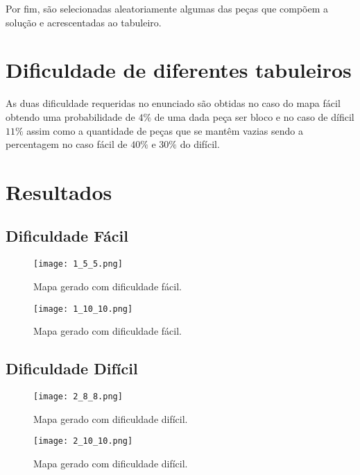 \documentclass[a4paper]{report} %
\begin{document}
Por fim, são selecionadas aleatoriamente algumas das peças que compõem a solução e acrescentadas ao tabuleiro.

\section{Dificuldade de diferentes tabuleiros}

As duas dificuldade requeridas no enunciado são obtidas no caso do mapa fácil obtendo uma probabilidade de $4\%$ de uma dada peça ser bloco e no caso de díficil $11\%$ assim como a quantidade de peças que se mantêm vazias sendo a percentagem no caso fácil de $40\%$ e $30\%$ do difícil.

\section{Resultados}

\subsection{Dificuldade Fácil}

\begin{figure}[ht]
    \centering
    \texttt{[image: 1\_5\_5.png]}
    \caption{Mapa gerado com dificuldade fácil.}
\end{figure}

\begin{figure}[ht]
    \centering
    \texttt{[image: 1\_10\_10.png]}
    \caption{Mapa gerado com dificuldade fácil.}
\end{figure}

\newpage

\subsection{Dificuldade Difícil}

\begin{figure}[ht]
    \centering
    \texttt{[image: 2\_8\_8.png]}
    \caption{Mapa gerado com dificuldade difícil.}
\end{figure}

\begin{figure}[ht]
    \centering
    \texttt{[image: 2\_10\_10.png]}
    \caption{Mapa gerado com dificuldade difícil.}
\end{figure}
\end{document}
